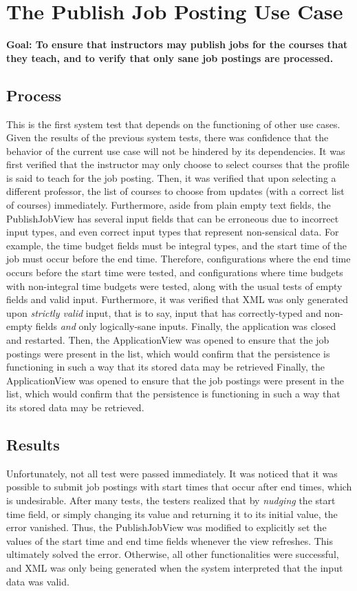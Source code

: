 \documentclass[12pt]{report}
\begin{document}
\section{The Publish Job Posting Use Case}
\textbf{Goal: To ensure that instructors may publish jobs for the courses that they teach, and to
verify that only sane job postings are processed.}
\subsection*{Process}
This is the first system test that depends on the functioning of other use cases. Given the results
of the previous system tests, there was confidence that the behavior of the current use case will
not be hindered by its dependencies. It was first verified that the instructor may only choose to
select courses that the profile is said to teach for the job posting. Then, it was verified that
upon selecting a different professor, the list of courses to choose from updates (with a correct
list of courses) immediately. Furthermore, aside from plain empty text fields, the PublishJobView
has several input fields that can be erroneous due to incorrect input types, and even correct input
types that represent non-sensical data. For example, the time budget fields must be integral types,
and the start time of the job must occur before the end time. Therefore, configurations where the
end time occurs before the start time were tested, and configurations where time budgets with
non-integral time budgets were tested, along with the usual tests of empty fields and valid input.
Furthermore, it was verified that XML was only generated upon \textit{strictly valid} input, that is
to say, input that has correctly-typed and non-empty fields \textit{and} only logically-sane inputs.
Finally, the application was closed and restarted. Then, the ApplicationView was opened to ensure that
the job postings were present in the list,
which would confirm that the persistence is functioning in such a way that its stored data may be
retrieved Finally, the ApplicationView was opened to ensure that the job postings were present in
the list, which would confirm that the persistence is functioning in such a way that its stored data
may be retrieved.
\subsection*{Results}
Unfortunately, not all test were passed immediately. It was noticed that it was possible to submit
job postings with start times that occur after end times, which is undesirable. After many tests,
the testers realized that by \textit{nudging} the start time field, or simply changing its value and
returning it to its initial value, the error vanished. Thus, the PublishJobView was modified to
explicitly set the values of the start time and end time fields whenever the view refreshes. This
ultimately solved the error. Otherwise, all other functionalities were successful, and XML was only
being generated when the system interpreted that the input data was valid.
\end{document}
